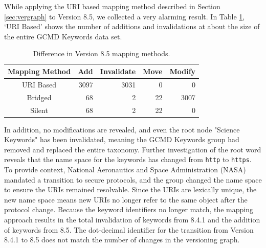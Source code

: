 While applying the URI based mapping method described in Section \ref{sec:vergraph} to Version 8.5, we collected a very alarming result.
In Table \ref{table:GCMD_8_5}, `URI Based' shows the number of additions and invalidations at about the size of the entire GCMD Keywords data set.
\begin{table}
	\caption{Difference in Version 8.5 mapping methods.}
	\label{table:GCMD_8_5}
	\centering
	\begin{tabular}{@{}crrrr@{}}
		\toprule
		Mapping Method&	Add&	Invalidate&	Move&	Modify\\
		\midrule
		URI Based&	3097&	3031&	0&	0\\
		Bridged&	68&	2&	22&	3007\\		
		Silent&	68&	2&	22&	0\\
		\bottomrule
	\end{tabular}
\end{table}
In addition, no modifications are revealed, and even the root node "Science Keywords" has been invalidated, meaning the GCMD Keywords group had removed and replaced the entire taxonomy.
Further investigation of the root word reveals that the name space for the keywords has changed from \texttt{http} to \texttt{https}.
To provide context, National Aeronautics and Space Administration (NASA) mandated a transition to secure protocols, and the group changed the name space to ensure the URIs remained resolvable.
Since the URIs are lexically unique, the new name space means new URIs no longer refer to the same object after the protocol change.
Because the keyword identifiers no longer match, the mapping approach results in the total invalidation of keywords from 8.4.1 and the addition of keywords from 8.5.
The dot-decimal identifier for the transition from Version 8.4.1 to 8.5 does not match the number of changes in the versioning graph.

